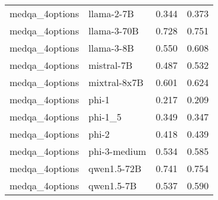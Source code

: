 \begin{tabular}{llrr}
medqa_4options & llama-2-7B & 0.344 & 0.373 \\
medqa_4options & llama-3-70B & 0.728 & 0.751 \\
medqa_4options & llama-3-8B & 0.550 & 0.608 \\
medqa_4options & mistral-7B & 0.487 & 0.532 \\
medqa_4options & mixtral-8x7B & 0.601 & 0.624 \\
medqa_4options & phi-1 & 0.217 & 0.209 \\
medqa_4options & phi-1_5 & 0.349 & 0.347 \\
medqa_4options & phi-2 & 0.418 & 0.439 \\
medqa_4options & phi-3-medium & 0.534 & 0.585 \\
medqa_4options & qwen1.5-72B & 0.741 & 0.754 \\
medqa_4options & qwen1.5-7B & 0.537 & 0.590 \\
\bottomrule
\end{tabular}
